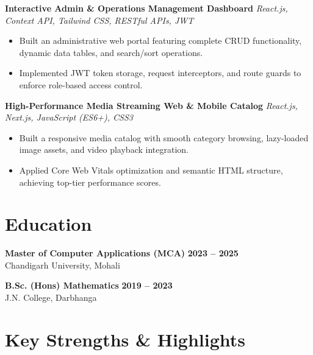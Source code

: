 \documentclass[a4paper,10pt]{article}
\begin{document}
\textbf{Interactive Admin \& Operations Management Dashboard}
\hfill
\textit{React.js, Context API, Tailwind CSS, RESTful APIs, JWT}

\begin{itemize}

    \item Built an administrative web portal featuring complete CRUD functionality, dynamic data tables, and search/sort operations.

    \item Implemented JWT token storage, request interceptors, and route guards to enforce role-based access control.

\end{itemize}


\textbf{High-Performance Media Streaming Web \& Mobile Catalog}
\hfill
\textit{React.js, Next.js, JavaScript (ES6+), CSS3}

\begin{itemize}

    \item Built a responsive media catalog with smooth category browsing, lazy-loaded image assets, and video playback integration.

    \item Applied Core Web Vitals optimization and semantic HTML structure, achieving top-tier performance scores.

\end{itemize}

\section*{Education}

\textbf{Master of Computer Applications (MCA)}
\hfill
\textbf{2023 -- 2025}
\\
Chandigarh University, Mohali

\vspace{3pt}

\textbf{B.Sc. (Hons) Mathematics}
\hfill
\textbf{2019 -- 2023}
\\
J.N. College, Darbhanga

\section*{Key Strengths \& Highlights}
\end{document}
